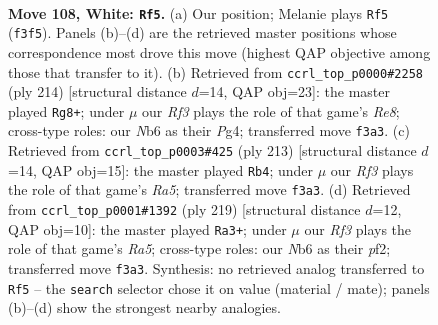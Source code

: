 \documentclass[11pt]{article}
\begin{document}
\clearpage

\begin{figure}[p]\centering
\begin{subfigure}{0.46\textwidth}\centering
\resizebox{\linewidth}{!}{%
\newchessgame
\chessboard[
  setfen={8/6p1/1N3p1k/7p/7P/5RPK/4r3/8 w - - 40 108},
  showmover=false,
  pgfstyle=straightmove, color=movearrow, markmove={f3-f5}
]}
\caption{}
\end{subfigure}\hfill
\begin{subfigure}{0.46\textwidth}\centering
\resizebox{\linewidth}{!}{%
\newchessgame
\chessboard[
  setfen={4R3/8/6k1/1r2p1p1/5pP1/5P2/4PK2/8 w - - 18 108},
  showmover=false,
  pgfstyle=straightmove, color=movearrow, markmove={e8-g8}
]}
\caption{}
\end{subfigure}
\\[4pt]
\begin{subfigure}{0.46\textwidth}\centering
\resizebox{\linewidth}{!}{%
\newchessgame
\chessboard[
  setfen={8/5pk1/7p/4KP2/r4PP1/2R5/8/8 b - - 4 107},
  showmover=false,
  pgfstyle=straightmove, color=movearrow, markmove={a4-b4}
]}
\caption{}
\end{subfigure}\hfill
\begin{subfigure}{0.46\textwidth}\centering
\resizebox{\linewidth}{!}{%
\newchessgame
\chessboard[
  setfen={1R6/5pk1/6p1/7p/r6P/5KP1/5P2/8 b - - 38 110},
  showmover=false,
  pgfstyle=straightmove, color=movearrow, markmove={a4-a3}
]}
\caption{}
\end{subfigure}
\caption{\textbf{Move 108, White: \texttt{Rf5}.} (a) Our position; Melanie plays \texttt{Rf5} (\texttt{f3f5}). Panels (b)--(d) are the retrieved master positions whose correspondence most drove this move (highest QAP objective among those that transfer to it). (b) Retrieved from \texttt{ccrl\_top\_p0000\#2258} (ply 214) [structural distance $d$=14, QAP obj=23]: the master played \texttt{Rg8+}; under $\mu$ our \emph{Rf3} plays the role of that game's \emph{Re8}; cross-type roles: our \emph{N}b6 as their \emph{P}g4; transferred move \texttt{f3a3}. (c) Retrieved from \texttt{ccrl\_top\_p0003\#425} (ply 213) [structural distance $d$=14, QAP obj=15]: the master played \texttt{Rb4}; under $\mu$ our \emph{Rf3} plays the role of that game's \emph{Ra5}; transferred move \texttt{f3a3}. (d) Retrieved from \texttt{ccrl\_top\_p0001\#1392} (ply 219) [structural distance $d$=12, QAP obj=10]: the master played \texttt{Ra3+}; under $\mu$ our \emph{Rf3} plays the role of that game's \emph{Ra5}; cross-type roles: our \emph{N}b6 as their \emph{p}f2; transferred move \texttt{f3a3}. Synthesis: no retrieved analog transferred to \texttt{Rf5} -- the \texttt{search} selector chose it on value (material / mate); panels (b)--(d) show the strongest nearby analogies.}
\label{fig:thought-m214}
\end{figure}
\end{document}
